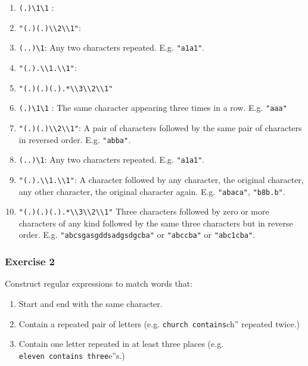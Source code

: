 \documentclass[]{book}
\providecommand{\tightlist}{%
  \setlength{\itemsep}{0pt}\setlength{\parskip}{0pt}}
\theoremstyle{plain}
\theoremstyle{remark}
\theoremstyle{definition}
\theoremstyle{definition}
\theoremstyle{definition}
\theoremstyle{remark}
\begin{document}
\begin{enumerate}
\def\labelenumi{\arabic{enumi}.}
\item
  \texttt{(.)\textbackslash{}1\textbackslash{}1} :
\item
  \texttt{"(.)(.)\textbackslash{}\textbackslash{}2\textbackslash{}\textbackslash{}1"}:
\item
  \texttt{(..)\textbackslash{}1}: Any two characters repeated. E.g.
  \texttt{"a1a1"}.
\item
  \texttt{"(.).\textbackslash{}\textbackslash{}1.\textbackslash{}\textbackslash{}1"}:
\item
  \texttt{"(.)(.)(.).*\textbackslash{}\textbackslash{}3\textbackslash{}\textbackslash{}2\textbackslash{}\textbackslash{}1"}
\item
  \texttt{(.)\textbackslash{}1\textbackslash{}1} : The same character
  appearing three times in a row. E.g. \texttt{"aaa"}
\item
  \texttt{"(.)(.)\textbackslash{}\textbackslash{}2\textbackslash{}\textbackslash{}1"}:
  A pair of characters followed by the same pair of characters in
  reversed order. E.g. \texttt{"abba"}.
\item
  \texttt{(..)\textbackslash{}1}: Any two characters repeated. E.g.
  \texttt{"a1a1"}.
\item
  \texttt{"(.).\textbackslash{}\textbackslash{}1.\textbackslash{}\textbackslash{}1"}:
  A character followed by any character, the original character, any
  other character, the original character again. E.g. \texttt{"abaca"},
  \texttt{"b8b.b"}.
\item
  \texttt{"(.)(.)(.).*\textbackslash{}\textbackslash{}3\textbackslash{}\textbackslash{}2\textbackslash{}\textbackslash{}1"}
  Three characters followed by zero or more characters of any kind
  followed by the same three characters but in reverse order. E.g.
  \texttt{"abcsgasgddsadgsdgcba"} or \texttt{"abccba"} or
  \texttt{"abc1cba"}.
\end{enumerate}

\hypertarget{exercise-2-34}{%
\subsubsection{Exercise 2}\label{exercise-2-34}}

Construct regular expressions to match words that:

\begin{enumerate}
\def\labelenumi{\arabic{enumi}.}
\tightlist
\item
  Start and end with the same character.
\item
  Contain a repeated pair of letters (e.g.
  \texttt{church\textquotesingle{}\textquotesingle{}\ contains}ch''
  repeated twice.)
\item
  Contain one letter repeated in at least three places (e.g.
  \texttt{eleven\textquotesingle{}\textquotesingle{}\ contains\ three}e''s.)
\end{enumerate}
\end{document}
